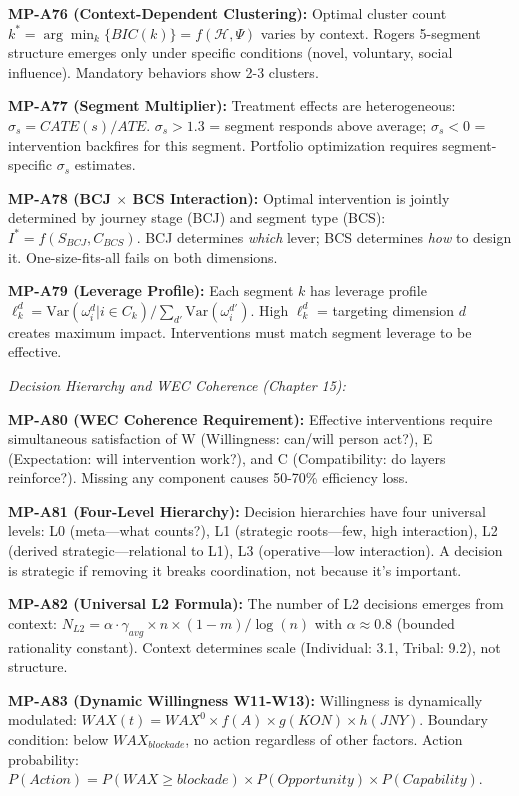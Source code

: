 \begin{tcolorbox}[colback=gray!5!white, colframe=gray!75!black,
    title=\textbf{MP Axioms}]
\textbf{MP-A76 (Context-Dependent Clustering):} Optimal cluster count $k^* = \arg\min_k\{BIC(k)\} = f(\mathcal{H}, \Psi)$ varies by context. Rogers 5-segment structure emerges only under specific conditions (novel, voluntary, social influence). Mandatory behaviors show 2-3 clusters.

\textbf{MP-A77 (Segment Multiplier):} Treatment effects are heterogeneous: $\sigma_s = CATE(s)/ATE$. $\sigma_s > 1.3$ = segment responds above average; $\sigma_s < 0$ = intervention backfires for this segment. Portfolio optimization requires segment-specific $\sigma_s$ estimates.

\textbf{MP-A78 (BCJ $\times$ BCS Interaction):} Optimal intervention is jointly determined by journey stage (BCJ) and segment type (BCS): $I^* = f(S_{BCJ}, C_{BCS})$. BCJ determines \textit{which} lever; BCS determines \textit{how} to design it. One-size-fits-all fails on both dimensions.

\textbf{MP-A79 (Leverage Profile):} Each segment $k$ has leverage profile $\ell_k^d = \text{Var}(\omega_i^d | i \in C_k) / \sum_{d'}\text{Var}(\omega_i^{d'})$. High $\ell_k^d$ = targeting dimension $d$ creates maximum impact. Interventions must match segment leverage to be effective.

\medskip
\textit{Decision Hierarchy and WEC Coherence (Chapter 15):}

\textbf{MP-A80 (WEC Coherence Requirement):} Effective interventions require simultaneous satisfaction of W (Willingness: can/will person act?), E (Expectation: will intervention work?), and C (Compatibility: do layers reinforce?). Missing any component causes 50-70\% efficiency loss.

\textbf{MP-A81 (Four-Level Hierarchy):} Decision hierarchies have four universal levels: L0 (meta---what counts?), L1 (strategic roots---few, high interaction), L2 (derived strategic---relational to L1), L3 (operative---low interaction). A decision is strategic if removing it breaks coordination, not because it's important.

\textbf{MP-A82 (Universal L2 Formula):} The number of L2 decisions emerges from context: $N_{L2} = \alpha \cdot \gamma_{avg} \times n \times (1-m) / \log(n)$ with $\alpha \approx 0.8$ (bounded rationality constant). Context determines scale (Individual: 3.1, Tribal: 9.2), not structure.

\textbf{MP-A83 (Dynamic Willingness W11-W13):} Willingness is dynamically modulated: $WAX(t) = WAX^0 \times f(A) \times g(KON) \times h(JNY)$. Boundary condition: below $WAX_{blockade}$, no action regardless of other factors. Action probability: $P(Action) = P(WAX \geq blockade) \times P(Opportunity) \times P(Capability)$.


\end{tcolorbox}
